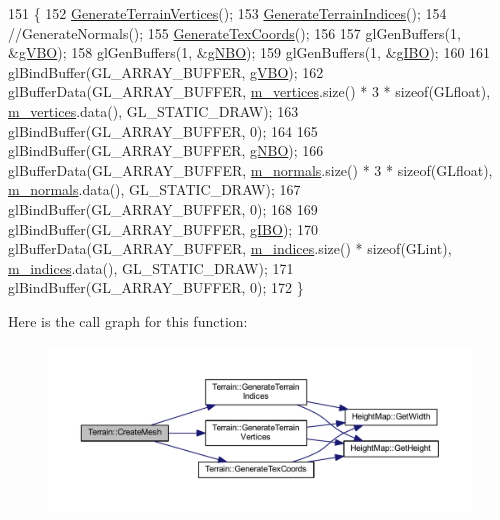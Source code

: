 \begin{DoxyCode}
151 \{
152   \hyperlink{class_terrain_a7b82fc680b5747dadda8477bdcf33cf9}{GenerateTerrainVertices}();
153   \hyperlink{class_terrain_a6d4038969c8f9db67de07f03b2ac6b9a}{GenerateTerrainIndices}();
154   \textcolor{comment}{//GenerateNormals();}
155   \hyperlink{class_terrain_a39c46be48d267589430a97b00cd3399d}{GenerateTexCoords}();
156 
157   glGenBuffers(1, &\hyperlink{class_terrain_a3eeadcd1e1679c7e7b9abeb0246f186a}{gVBO});
158   glGenBuffers(1, &\hyperlink{class_terrain_a5ad7a9eeec86bdb40e4c124b1b889bd3}{gNBO});
159   glGenBuffers(1, &\hyperlink{class_terrain_a5c60778885e518bb5081c2f85ab0146a}{gIBO});
160 
161   glBindBuffer(GL\_ARRAY\_BUFFER, \hyperlink{class_terrain_a3eeadcd1e1679c7e7b9abeb0246f186a}{gVBO});
162   glBufferData(GL\_ARRAY\_BUFFER, \hyperlink{class_terrain_aae8e29e9fa34cddbac685e2ab286cf90}{m\_vertices}.size() * 3 * \textcolor{keyword}{sizeof}(GLfloat), 
      \hyperlink{class_terrain_aae8e29e9fa34cddbac685e2ab286cf90}{m\_vertices}.data(), GL\_STATIC\_DRAW);
163   glBindBuffer(GL\_ARRAY\_BUFFER, 0);
164 
165   glBindBuffer(GL\_ARRAY\_BUFFER, \hyperlink{class_terrain_a5ad7a9eeec86bdb40e4c124b1b889bd3}{gNBO});
166   glBufferData(GL\_ARRAY\_BUFFER, \hyperlink{class_terrain_a36373bed2c1e63fa67f584ec16abc3da}{m\_normals}.size() * 3 * \textcolor{keyword}{sizeof}(GLfloat), 
      \hyperlink{class_terrain_a36373bed2c1e63fa67f584ec16abc3da}{m\_normals}.data(), GL\_STATIC\_DRAW);
167   glBindBuffer(GL\_ARRAY\_BUFFER, 0);
168 
169   glBindBuffer(GL\_ARRAY\_BUFFER, \hyperlink{class_terrain_a5c60778885e518bb5081c2f85ab0146a}{gIBO});
170   glBufferData(GL\_ARRAY\_BUFFER, \hyperlink{class_terrain_a79132b320d28c77f4c7cb55b9f562631}{m\_indices}.size() * \textcolor{keyword}{sizeof}(GLint), 
      \hyperlink{class_terrain_a79132b320d28c77f4c7cb55b9f562631}{m\_indices}.data(), GL\_STATIC\_DRAW);
171   glBindBuffer(GL\_ARRAY\_BUFFER, 0);
172 \}
\end{DoxyCode}


Here is the call graph for this function\+:
\nopagebreak
\begin{figure}[H]
\begin{center}
\leavevmode
\includegraphics[width=350pt]{class_terrain_ae7bafb8ba2f656805c07fbef600a35c4_cgraph}
\end{center}
\end{figure}





